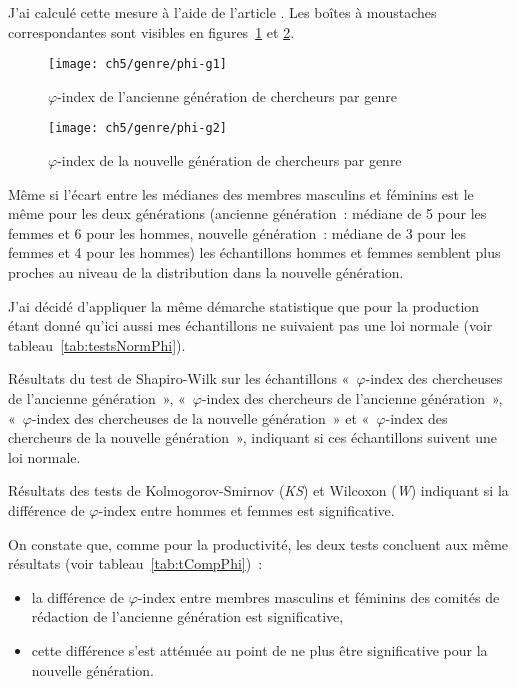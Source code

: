 			J'ai calculé cette mesure à l'aide de l'article \citep{partnership}. Les boîtes à moustaches correspondantes sont visibles en figures~\ref{fig:phi-g1} et \ref{fig:phi-g2}.
			
			\begin{figure}[p]
				\centering
				\texttt{[image: ch5/genre/phi-g1]}
				\caption{$\varphi$-index de l'ancienne génération de chercheurs par genre}\label{fig:phi-g1}
			\end{figure}
			
			\begin{figure}[p]
				\centering
				\texttt{[image: ch5/genre/phi-g2]}
				\caption{$\varphi$-index de la nouvelle génération de chercheurs par genre}\label{fig:phi-g2}
			\end{figure}
			
			Même si l'écart entre les médianes des membres masculins et féminins est le même pour les deux générations (ancienne génération~: médiane de 5 pour les femmes et 6 pour les hommes, nouvelle génération~: médiane de 3 pour les femmes et 4 pour les hommes) les échantillons hommes et femmes semblent plus proches au niveau de la distribution dans la nouvelle génération.
			
			J'ai décidé d'appliquer la même démarche statistique que pour la production étant donné qu'ici aussi mes échantillons ne suivaient pas une loi normale (voir tableau~\ref{tab:testsNormPhi}).
			
			\begin{table}[ht]
				\centering
				\caption{Résultats du test de Shapiro-Wilk sur les échantillons «~$\varphi$-index des chercheuses de l'ancienne génération~», «~$\varphi$-index des chercheurs de l'ancienne génération~», «~$\varphi$-index des chercheuses de la nouvelle génération~» et «~$\varphi$-index des chercheurs de la nouvelle génération~», indiquant si ces échantillons suivent une loi normale.}\label{tab:testsNormPhi}
				
			\end{table}
			
			\begin{table}[h]
				\centering
				\caption{Résultats des tests de Kolmogorov-Smirnov (\textit{KS}) et Wilcoxon (\textit{W}) indiquant si la différence de $\varphi$-index entre hommes et femmes est significative.}\label{tab:tCompPhi}
				
			\end{table}
			
			On constate que, comme pour la productivité, les deux tests concluent aux même résultats (voir tableau~\ref{tab:tCompPhi})~:
			\begin{itemize}
				\item la différence de $\varphi$-index entre membres masculins et féminins des comités de rédaction de l'ancienne génération est significative,
				\item cette différence s'est atténuée au point de ne plus être significative pour la nouvelle génération.
			\end{itemize}
	

